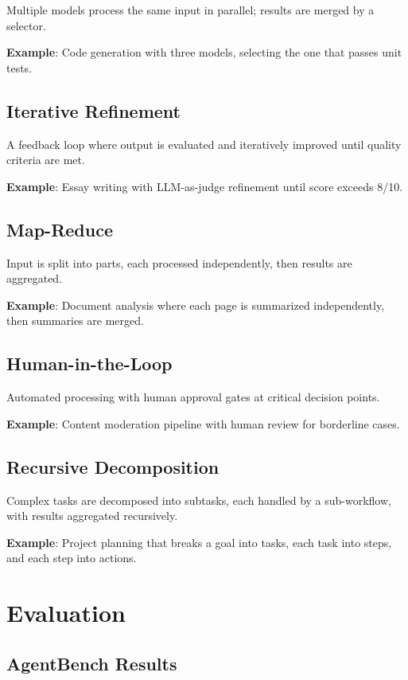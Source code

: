 \documentclass[11pt,twocolumn]{article}
\begin{document}
Multiple models process the same input in parallel; results are merged by a selector.

\textbf{Example}: Code generation with three models, selecting the one that passes unit tests.

\subsection{Iterative Refinement}

A feedback loop where output is evaluated and iteratively improved until quality criteria are met.

\textbf{Example}: Essay writing with LLM-as-judge refinement until score exceeds 8/10.

\subsection{Map-Reduce}

Input is split into parts, each processed independently, then results are aggregated.

\textbf{Example}: Document analysis where each page is summarized independently, then summaries are merged.

\subsection{Human-in-the-Loop}

Automated processing with human approval gates at critical decision points.

\textbf{Example}: Content moderation pipeline with human review for borderline cases.

\subsection{Recursive Decomposition}

Complex tasks are decomposed into subtasks, each handled by a sub-workflow, with results aggregated recursively.

\textbf{Example}: Project planning that breaks a goal into tasks, each task into steps, and each step into actions.

\section{Evaluation}
\label{sec:evaluation}

\subsection{AgentBench Results}
\end{document}
